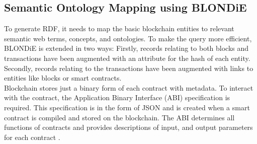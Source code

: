 \subsection{Semantic Ontology Mapping using BLONDiE} 
To generate RDF, it needs to map the basic blockchain entities to relevant semantic web terms, concepts, and ontologies. To make the query more efficient, BLONDiE is extended in two ways: Firstly, records relating to both blocks and transactions have been
augmented with an attribute for the hash of each entity. Secondly, records relating to the transactions have been augmented with links to entities like blocks or smart contracts.\\
Blockchain stores just a binary form of each contract with metadata. To interact with the contract, the Application Binary Interface (ABI) specification is required. This specification is in the form of JSON and is created when a smart contract is compiled and stored on the blockchain. The ABI determines all functions of contracts and provides descriptions of input, and output parameters for each contract \cite{Third}.

